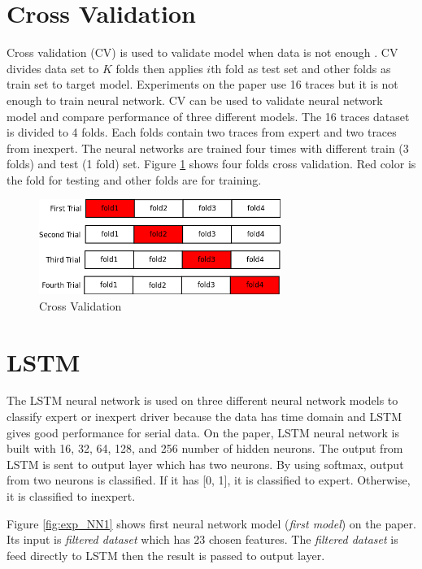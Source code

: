 \documentclass[draft,dvipsnames]{drexel-thesis}
\begin{document}
\begin{thesis}
\section{Cross Validation}
Cross validation (CV) is used to validate model when data is not enough \cite{Goodfellow-et-al-2016}. CV divides data set to $K$ folds then applies $i$th fold as test set and other folds as train set to target model. Experiments on the paper use 16 traces but it is not enough to train neural network. CV can be used to validate neural network model and compare performance of three different models. The 16 traces dataset is divided to 4 folds. Each folds contain two traces from expert and two traces from inexpert. The neural networks are trained four times with different train (3 folds) and test (1 fold) set. Figure \ref{fig:CV} shows four folds cross validation. Red color is the fold for testing and other folds are for training.

\begin{figure}[t!]
    \centering
    \includegraphics[width=0.7\textwidth]{pictures/figures/CV.png}
    \caption{Cross Validation}
    \label{fig:CV}
\end{figure}


\section{LSTM}
The LSTM neural network is used on three different neural network models to classify expert or inexpert driver because the data has time domain and LSTM gives good performance for serial data. On the paper, LSTM neural network is built with 16, 32, 64, 128, and 256 number of hidden neurons. The output from LSTM is sent to output layer which has two neurons. By using softmax, output from two neurons is classified. If it has [0, 1], it is classified to expert. Otherwise, it is classified to inexpert.

Figure \ref{fig:exp_NN1} shows first neural network model ({\em first model}) on the paper. Its input is {\em filtered dataset} which has 23 chosen features. The {\em filtered dataset} is feed directly to LSTM then the result is passed to output layer.


\end{thesis}
\end{document}
